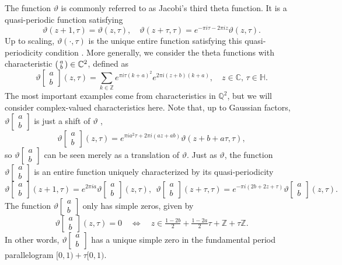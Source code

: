 \documentclass[reqno,a4paper,12pt]{amsart}
\numberwithin{equation}{section}
\newcommand{\Z}{\mathbb Z}
\newcommand{\C}{\mathbb C}
\newcommand{\Q}{\mathbb Q}
\newcommand{\HH}{\mathbb H}
\newcommand{\thetac}[2]{{\vartheta\left[\begin{smallmatrix}
        #1 \\ #2
    \end{smallmatrix}\right]}}
\begin{document}
The function $\vartheta$ is commonly referred to as Jacobi's third theta function. It is a quasi-periodic function satisfying 
\begin{equation}
\vartheta(z+1,\tau)=\vartheta(z,\tau),
\quad
\vartheta(z+\tau,\tau)=e^{-\pi i\tau-2\pi i z}\vartheta(z,\tau).
\end{equation}
Up to scaling, $\vartheta(\cdot,\tau)$ is the unique entire function satisfying this quasi-periodicity condition \cite[Chap.~2,~Cor.~1.9.]{FarkasKra2001}. 
More generally, we consider the theta functions with characteristic $\begin{psmallmatrix}
    a\\b
\end{psmallmatrix}\in\C^2$, defined as
\begin{equation}\label{eq:def:thetac}
    \vartheta\left[\begin{smallmatrix}
        a \\ b
    \end{smallmatrix}\right](z,\tau) =\sum\limits_{k\in\Z}e^{\pi i \tau (k+a)^2}e^{2\pi i (z+b) (k+a)},\quad z\in \C,\, \tau\in \HH.
\end{equation}
The most important examples come from characteristics in $\Q^2$, but we will consider complex-valued characteristics here. 
Note that, up to Gaussian factors, $\thetac{a}{b}$ is just a shift of $\vartheta$ \cite[p.~73]{FarkasKra2001},
\begin{equation}\label{eq:thetac_vs_vartheta}
    \thetac{a}{b}(z,\tau) = e^{\pi i a^2\tau + 2\pi i (az +ab)}\vartheta(z+b+a\tau, \tau),
\end{equation}
so $\thetac{a}{b}$ can be seen merely as a translation of $\vartheta$.
Just as $\vartheta$, the function $\thetac{a}{b}$ is an entire function uniquely characterized by its quasi-periodicity
\begin{equation}\label{eq:thetac_quasip}
\thetac{a}{b}(z+1,\tau)=e^{2\pi i a}\thetac{a}{b}(z,\tau),
\ \
\thetac{a}{b}(z+\tau,\tau)=e^{-\pi i(2b+2z +\tau)}\thetac{a}{b}(z,\tau).
\end{equation}
The  function $\thetac{a}{b}$ only has simple zeros, given by 
\begin{equation}\label{eq:zeros}
    \thetac{a}{b}(z,\tau)=0 \quad\Leftrightarrow\quad z \in \tfrac{1-2b}{2} +\tfrac{1-2a}{2}\tau +\Z+\tau\Z.
\end{equation}
In other words, $\thetac{a}{b}$ has a unique simple zero in the 
fundamental period parallelogram $[0,1)+\tau[0,1)$. 
\end{document}
